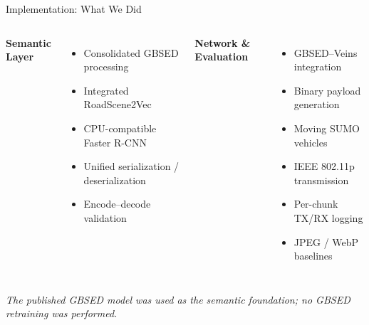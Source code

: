 \documentclass[aspectratio=169]{beamer}
\begin{document}
\begin{frame}{Implementation: What We Did}

\begin{columns}[T]


\textbf{Semantic Layer}

\begin{itemize}
    \item Consolidated GBSED processing
    \item Integrated RoadScene2Vec
    \item CPU-compatible Faster R-CNN
    \item Unified serialization / deserialization
    \item Encode--decode validation
\end{itemize}


\textbf{Network \& Evaluation}

\begin{itemize}
    \item GBSED--Veins integration
    \item Binary payload generation
    \item Moving SUMO vehicles
    \item IEEE 802.11p transmission
    \item Per-chunk TX/RX logging
    \item JPEG / WebP baselines
\end{itemize}

\end{columns}

\vspace{0.25cm}

\begin{center}
\textit{The published GBSED model was used as the semantic foundation;
no GBSED retraining was performed.}
\end{center}

\end{frame}
\end{document}
